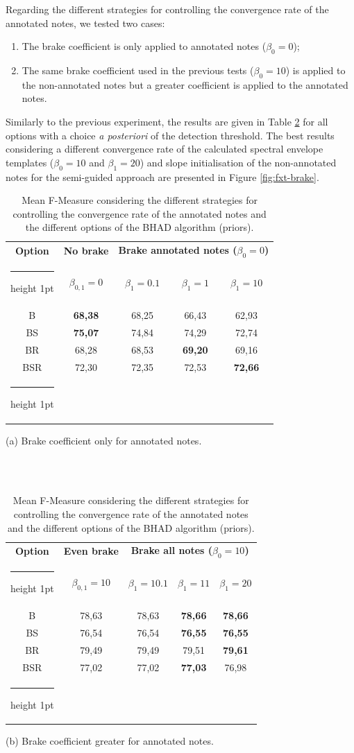 \documentclass{article}
\makeatletter
\newcommand{\thickhline}{%
    \noalign {\ifnum 0=`}\fi \hrule height 1pt
    \futurelet \reserved@a \@xhline
}
\makeatother
\begin{document}
Regarding the different strategies for controlling the convergence rate of the annotated notes, we tested two cases:

\begin{enumerate}
\item The brake coefficient is only applied to annotated notes ($\beta_0=0$);
\item The same brake coefficient used in the previous tests ($\beta_0=10$) is applied to the non-annotated notes but a greater coefficient is applied to the annotated notes. 
\end{enumerate}
Similarly to the previous experiment, the results are given in Table \ref{tab:brake} for all options with a choice \textit{a posteriori} of the detection threshold. The best results considering a different convergence rate of the calculated spectral envelope templates ($\beta_0=10$ and $\beta_1=20$) and  slope initialisation of the non-annotated notes for the semi-guided approach are presented in Figure \ref{fig:fxt-brake}.


\begin{table}[htb]
\begin{tabular}{ccccc}
\hline
\textbf{Option} & \textbf{No brake} & \multicolumn{3}{c}{\textbf{Brake annotated notes ($\beta_0=0$)}} \\\thickhline
& $\beta_{0,1}=0$ & $\beta_1=0.1$ & $\beta_1=1$ & $\beta_1=10$ \\\hline
B	& \textbf{68,38} &	68,25	& 66,43 &	 62,93 \\
BS	& \textbf{75,07} &	 74,84 	& 74,29 &	 72,74 \\
BR	& 68,28 & 	 68,53 	& \textbf{69,20} & 	 69,16 \\
BSR	& 72,30 &	 72,35 	& 72,53 &	 \textbf{72,66} \\\thickhline
\end{tabular}
  \centerline{(a) Brake coefficient only for annotated notes.}
\\
\\%
\vspace{0.1cm}

\centering
 \begin{tabular}{ccccc}
 \hline
\textbf{Option} & \textbf{Even brake} & \multicolumn{3}{c}{\textbf{Brake all notes ($\beta_0=10$)}} \\\thickhline
& $\beta_{0,1}=10$ & $\beta_1=10.1$ & $\beta_1=11$ & $\beta_1=20$ \\\hline
B	& 78,63 &	78,63 & \textbf{78,66} &	\textbf{78,66} \\
BS	& 76,54 &	 76,54 &	\textbf{76,55} &	\textbf{76,55} \\
BR	& 79,49 &	 79,49 &	79,51 &	\textbf{79,61} \\
BSR	& 77,02 &	 77,02 &	\textbf{77,03} &	76,98 \\\thickhline
\end{tabular}
  \centerline{(b) Brake coefficient greater for annotated notes.}\medskip
\caption{Mean F-Measure considering the different strategies for controlling the convergence rate of the annotated notes and the different options of the BHAD algorithm (priors).}
\label{tab:brake}
\end{table}
\end{document}
